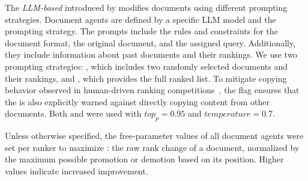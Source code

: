 The \textit{LLM-based} \botagent introduced by \citet{Niv} modifies documents using different prompting strategies.
Document agents are defined by a specific LLM model and the prompting strategy.
The prompts include the rules and constraints for the document format, the original document, and the assigned query.
Additionally, they include information about past documents and their rankings. 
We use two prompting strategies: \feedbackPair, which includes two randomly selected documents and their rankings, and \feedbackAll, which provides the full ranked list. 
To mitigate copying behavior observed in human-driven ranking competitions~\cite{Nimrod, Greg-Herding}, the \nocopy\xspace flag ensures that the \botagent is also explicitly warned against directly copying content from other documents. 
Both \llama and \gemma were used with $top_p=0.95$ and $temperature=0.7$.

Unless otherwise specified, the free-parameter values of all document agents were set per ranker to maximize : the raw rank change of a document, normalized by the maximum possible promotion or demotion based on its position. Higher values indicate increased improvement.
